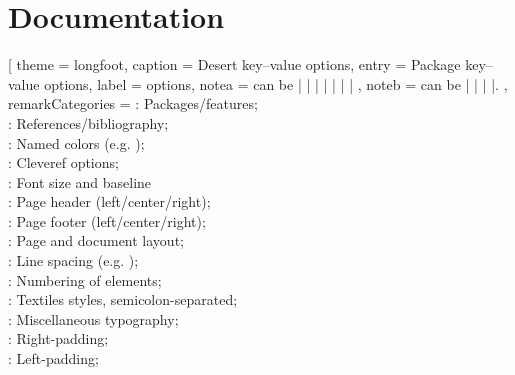 
\part{Documentation}


\begin{BigPages} [hmargin=0.5cm, vmargin=1cm]

\def \sep {{}\thinspace|\thinspace}

\begin{LongTable} [
    theme                  = longfoot,
    caption                = {Desert key--value options},
    entry                  = {Package key--value options},
    label                  = {options},
    note{a}                = {
         can be  \sep {} \sep {} \sep
         \sep {} \sep {} \sep
         \sep {}
    } ,
    note{b}                = {
         can be  \sep {} \sep
         \sep {} \sep {}.
    } ,
    remark{Categories}     = {
        : Packages/features;\\
        : References/bibliography;\\
        : Named colors (e.g. );\\
        : Cleveref options;\\
        : Font size and baseline\\
        : Page header (left/center/right);\\
        : Page footer (left/center/right);\\
        : Page and document layout;\\
        : Line spacing (e.g. );\\
        : Numbering of elements;\\
        : Textiles styles, semicolon-separated;\\
        : Miscellaneous typography;\\
        : Right-padding;\\
        : Left-padding;\\
}
\end{LongTable}
\end{BigPages}
